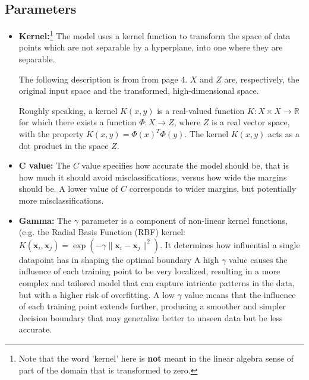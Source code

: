 \subsection{Parameters}
\begin{itemize}
	\item \textbf{Kernel:}\footnote{Note that the word 'kernel' here is \textbf{not} meant in the linear algebra sense of part of the domain that is transformed to zero.} The model uses a kernel function to transform the space of data points which are not separable by a hyperplane, into one where they are separable.

	      The following description is from \cite{support_vector_machine} from page 4. \( X \) and \(Z\) are, respectively, the original input space and the transformed, high-dimensional space.


	      Roughly speaking, a kernel \( K(x, y) \) is a real-valued
	      function \( K : X \times X \rightarrow \mathbb{R} \) for which there exists a
	      function \( \Phi : X \rightarrow Z \), where \( Z \) is a real vector space,
	      with the property \( K(x, y) = \Phi(x)^T \Phi(y) \). The
	      kernel \( K(x, y) \) acts as a dot product in the space \( Z \).

	\item \textbf{C value:} The \(C\) value specifies how accurate the model should be, that is how much it should avoid misclassifications, versus how wide the margins should be. A lower value of \(C\) corresponds to wider margins, but potentially more misclassifications. %

	\item \textbf{Gamma:}
	      The \( \gamma \) parameter is a component of non-linear kernel functions, (e.g. the Radial Basis Function (RBF) kernel: \(K(\mathbf{x}_i, \mathbf{x}_j) = \exp(-\gamma \|\mathbf{x}_i - \mathbf{x}_j\|^2)\). It determines how
	      influential a single datapoint has in shaping the optimal boundary
	      A high \( \gamma \) value causes the influence of each training point to be very localized, resulting in a more complex and tailored model that can capture intricate patterns in the data, but with a higher risk of overfitting. A low \( \gamma \) value means that the influence of each training point extends further, producing a smoother and simpler decision boundary that may generalize better to unseen data but be less accurate.
\end{itemize}

